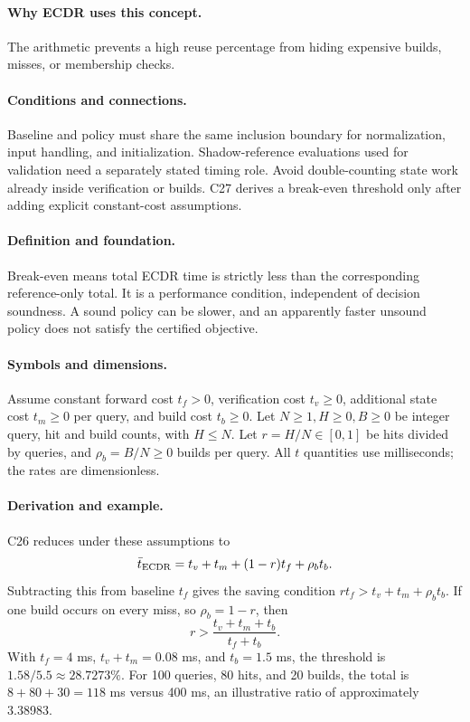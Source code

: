 \paragraph{Why ECDR uses this concept.}
The arithmetic prevents a high reuse percentage from hiding expensive builds, misses, or membership checks.
\paragraph{Conditions and connections.}
Baseline and policy must share the same inclusion boundary for normalization, input handling, and initialization. Shadow-reference evaluations used for validation need a separately stated timing role. Avoid double-counting state work already inside verification or builds. C27 derives a break-even threshold only after adding explicit constant-cost assumptions.

\paragraph{Definition and foundation.}
Break-even means total ECDR time is strictly less than the corresponding reference-only total. It is a performance condition, independent of decision soundness. A sound policy can be slower, and an apparently faster unsound policy does not satisfy the certified objective.
\paragraph{Symbols and dimensions.}
Assume constant forward cost $t_f>0$, verification cost $t_v\ge0$, additional state cost $t_m\ge0$ per query, and build cost $t_b\ge0$. Let $N\ge1,H\ge0,B\ge0$ be integer query, hit and build counts, with $H\le N$. Let $r=H/N\in[0,1]$ be hits divided by queries, and $\rho_b=B/N\ge0$ builds per query. All $t$ quantities use milliseconds; the rates are dimensionless.
\paragraph{Derivation and example.}
C26 reduces under these assumptions to
\[
 \bar t_{\rm ECDR}=t_v+t_m+(1-r)t_f+\rho_b t_b.
\]
Subtracting this from baseline $t_f$ gives the saving condition $rt_f>t_v+t_m+\rho_b t_b$. If one build occurs on every miss, so $\rho_b=1-r$, then
\[
 r>\frac{t_v+t_m+t_b}{t_f+t_b}.
\]
With $t_f=4$ ms, $t_v+t_m=0.08$ ms, and $t_b=1.5$ ms, the threshold is $1.58/5.5\approx28.7273\%$. For 100 queries, 80 hits, and 20 builds, the total is $8+80+30=118$ ms versus 400 ms, an illustrative ratio of approximately 3.38983.

